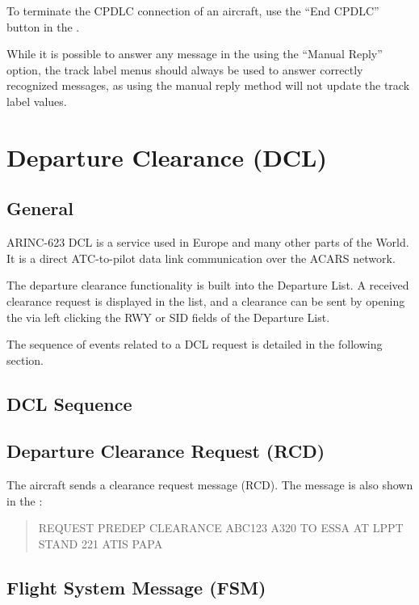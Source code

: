 \documentclass[11pt,a4paper]{memoir}
\newenvironment{Note}
  {\begin{shaded}\marginnote{\fbox{Note}}}
  {\end{shaded}}
\begin{document}
To terminate the CPDLC connection of an aircraft, use the “End CPDLC” button in the \textit{}.

\begin{Note}
  While it is possible to answer any message in the \textit{} using the “Manual Reply” option, the track label menus should always be used to answer correctly recognized messages, as using the manual reply method will not update the track label values.
\end{Note}

\section{Departure Clearance (DCL)}

\subsection{General}

ARINC-623 DCL is a service used in Europe and many other parts of the World. It is a direct ATC-to-pilot data link communication over the ACARS network.

The departure clearance functionality is built into the Departure List. A received clearance request is displayed in the list, and a clearance can be sent by opening the \textit{} via left clicking the RWY or SID fields of the Departure List.

The sequence of events related to a DCL request is detailed in the following section.

\subsection{DCL Sequence}

\subsection*{Departure Clearance Request (RCD)}

The aircraft sends a clearance request message (RCD). The message is also shown in the \textit{}:

\begin{quote}
  REQUEST PREDEP CLEARANCE ABC123 A320 TO ESSA AT LPPT STAND 221 ATIS PAPA
\end{quote}

\subsection*{Flight System Message (FSM)}
\end{document}
